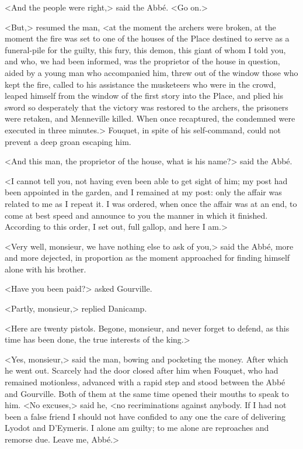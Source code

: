 <And the people were right,> said the Abbé. <Go on.>

<But,> resumed the man, <at the moment the archers were broken, at the moment the fire was set to one of the houses of the Place destined to serve as a funeral-pile for the guilty, this fury, this demon, this giant of whom I told you, and who, we had been informed, was the proprietor of the house in question, aided by a young man who accompanied him, threw out of the window those who kept the fire, called to his assistance the musketeers who were in the crowd, leaped himself from the window of the first story into the Place, and plied his sword so desperately that the victory was restored to the archers, the prisoners were retaken, and Menneville killed. When once recaptured, the condemned were executed in three minutes.> Fouquet, in spite of his self-command, could not prevent a deep groan escaping him.

<And this man, the proprietor of the house, what is his name?> said the Abbé.

<I cannot tell you, not having even been able to get sight of him; my post had been appointed in the garden, and I remained at my post: only the affair was related to me as I repeat it. I was ordered, when once the affair was at an end, to come at best speed and announce to you the manner in which it finished. According to this order, I set out, full gallop, and here I am.>

<Very well, monsieur, we have nothing else to ask of you,> said the Abbé, more and more dejected, in proportion as the moment approached for finding himself alone with his brother.

<Have you been paid?> asked Gourville.

<Partly, monsieur,> replied Danicamp.

<Here are twenty pistols. Begone, monsieur, and never forget to defend, as this time has been done, the true interests of the king.>

<Yes, monsieur,> said the man, bowing and pocketing the money. After which he went out. Scarcely had the door closed after him when Fouquet, who had remained motionless, advanced with a rapid step and stood between the Abbé and Gourville. Both of them at the same time opened their mouths to speak to him. <No excuses,> said he, <no recriminations against anybody. If I had not been a false friend I should not have confided to any one the care of delivering Lyodot and D'Eymeris. I alone am guilty; to me alone are reproaches and remorse due. Leave me, Abbé.>

